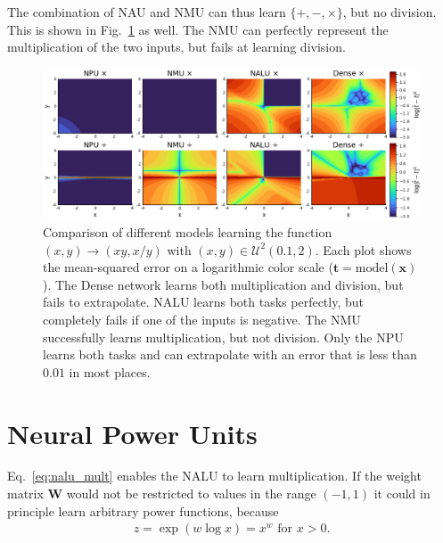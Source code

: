 \documentclass[9pt]{article}
\begin{document}
The combination of NAU and NMU can thus learn $\{+,-,\times\}$, but no division.
This is shown in Fig.~\ref{fig:compare_npu_nmu_nalu_xy_xdivy} as well. The NMU
can perfectly represent the multiplication of the two inputs, but fails at
learning division.


\begin{figure}
  \centering
  \includegraphics[width=0.8\linewidth]{compare-npu-nmu-nalu-xy-xdivy.png}
  \caption{Comparison of different models learning the function
  $(x,y)\rightarrow(xy,x/y)$ with $(x,y)\in\mathcal U^2(0.1,2)$.  Each
  plot shows the mean-squared error on a logarithmic color scale ($\hat{\bm
  t}=\text{model}(\bm x)$).  The Dense network learns both multiplication and
  division, but fails to extrapolate. NALU learns both tasks perfectly, but
  completely fails if one of the inputs is negative.  The NMU successfully
  learns multiplication, but not division. Only the NPU learns both tasks and
  can extrapolate with an error that is less than $0.01$ in most places.}%
  \label{fig:compare_npu_nmu_nalu_xy_xdivy}
\end{figure}


\section{Neural Power Units}%
\label{sec:neural_power_unit}

Eq.~\ref{eq:nalu_mult} enables the NALU to learn multiplication. If the weight
matrix $\bm W$ would not be restricted to values in the range $(-1,1)$ it could
in principle learn arbitrary power functions, because
\begin{align}
  z = \exp(w\log x) = x^w \text{ for } x>0.
\end{align}
\end{document}
